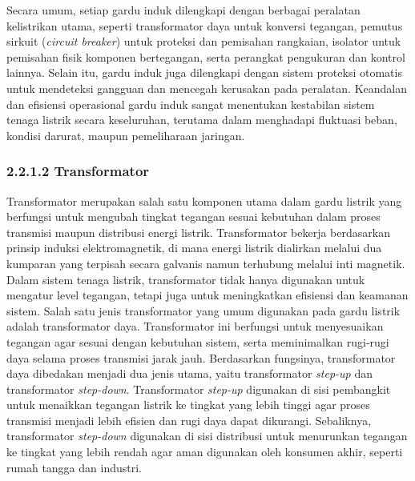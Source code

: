Secara umum, setiap gardu induk dilengkapi dengan berbagai peralatan kelistrikan utama, seperti transformator daya untuk konversi tegangan, pemutus sirkuit (\emph{circuit breaker}) untuk proteksi dan pemisahan rangkaian, isolator untuk pemisahan fisik komponen bertegangan, serta perangkat pengukuran dan kontrol lainnya. Selain itu, gardu induk juga dilengkapi dengan sistem proteksi otomatis untuk mendeteksi gangguan dan mencegah kerusakan pada peralatan. Keandalan dan efisiensi operasional gardu induk sangat menentukan kestabilan sistem tenaga listrik secara keseluruhan, terutama dalam menghadapi fluktuasi beban, kondisi darurat, maupun pemeliharaan jaringan\cite{gonen2016electric}.



\subsubsection{2.2.1.2 Transformator}

Transformator merupakan salah satu komponen utama dalam gardu listrik yang berfungsi untuk mengubah tingkat tegangan sesuai kebutuhan dalam proses transmisi maupun distribusi energi listrik. Transformator bekerja berdasarkan prinsip induksi elektromagnetik, di mana energi listrik dialirkan melalui dua kumparan yang terpisah secara galvanis namun terhubung melalui inti magnetik. Dalam sistem tenaga listrik, transformator tidak hanya digunakan untuk mengatur level tegangan, tetapi juga untuk meningkatkan efisiensi dan keamanan sistem. Salah satu jenis transformator yang umum digunakan pada gardu listrik adalah transformator daya. Transformator ini berfungsi untuk menyesuaikan tegangan agar sesuai dengan kebutuhan sistem, serta meminimalkan rugi-rugi daya selama proses transmisi jarak jauh. Berdasarkan fungsinya, transformator daya dibedakan menjadi dua jenis utama, yaitu transformator \emph{step-up} dan transformator \emph{step-down}. Transformator \emph{step-up} digunakan di sisi pembangkit untuk menaikkan tegangan listrik ke tingkat yang lebih tinggi agar proses transmisi menjadi lebih efisien dan rugi daya dapat dikurangi. Sebaliknya, transformator \emph{step-down} digunakan di sisi distribusi untuk menurunkan tegangan ke tingkat yang lebih rendah agar aman digunakan oleh konsumen akhir, seperti rumah tangga dan industri.


